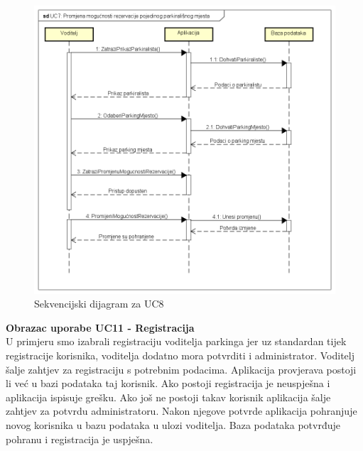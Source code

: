 \begin{packed_item}
				\begin{figure}[H]
					\includegraphics[width=\textwidth]{slike/PromjenaMogucnostiRezer.png} %
					\caption{Sekvencijski dijagram za UC8}
					\label{fig:mogucnostRezerv}
				\end{figure}
				\eject	
				
				
				\textbf{Obrazac uporabe UC11 - Registracija}\\
				
				U primjeru smo izabrali registraciju voditelja parkinga jer uz standardan tijek registracije korisnika, voditelja dodatno mora potvrditi i administrator. Voditelj šalje zahtjev za registraciju s potrebnim podacima. Aplikacija provjerava postoji li već u bazi podataka taj korisnik. Ako postoji registracija je neuspješna i aplikacija ispisuje grešku. Ako još ne postoji takav korisnik aplikacija šalje zahtjev za potvrdu administratoru. Nakon njegove potvrde aplikacija pohranjuje novog korisnika u bazu podataka u ulozi voditelja. Baza podataka potvrđuje pohranu i registracija je uspješna.
				\eject	
				

\end{packed_item}

